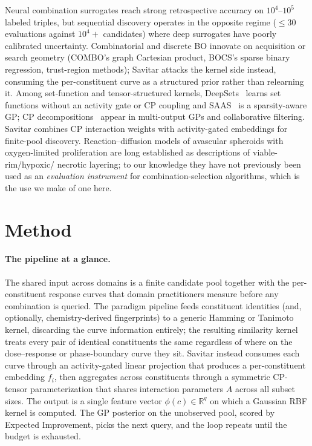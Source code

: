\documentclass{article}
\begin{document}
Neural combination surrogates reach strong retrospective accuracy on
$10^4$--$10^5$ labeled triples, but sequential discovery operates in the
opposite regime ($\le 30$ evaluations against $10^4+$ candidates) where
deep surrogates have poorly calibrated uncertainty. Combinatorial and
discrete BO innovate on acquisition or search geometry (COMBO's graph
Cartesian product, BOCS's sparse binary regression, trust-region methods);
Savitar attacks the kernel side instead, consuming the per-constituent curve
as a structured prior rather than relearning it. Among set-function and
tensor-structured kernels, DeepSets~\citep{zaheer2017} learns set functions without an activity
gate or CP coupling and SAAS~\citep{eriksson2021} is a sparsity-aware GP; CP decompositions~\citep{bro1997} appear
in multi-output GPs and collaborative filtering. Savitar combines CP
interaction weights with activity-gated embeddings for finite-pool discovery.
Reaction--diffusion models of avascular spheroids with oxygen-limited
proliferation are long established as descriptions of viable-rim/hypoxic/
necrotic layering; to our knowledge they have not previously been used as an
\emph{evaluation instrument} for combination-selection algorithms, which is
the use we make of one here.

\section{Method}
\label{sec:method}


\paragraph{The pipeline at a glance.} The shared input across domains is a
finite candidate pool together with the per-constituent response curves that
domain practitioners measure before any combination is queried. The paradigm
pipeline feeds constituent identities (and, optionally, chemistry-derived
fingerprints) to a generic Hamming or Tanimoto kernel, discarding the curve
information entirely; the resulting similarity kernel treats every pair of
identical constituents the same regardless of where on the dose--response or
phase-boundary curve they sit. Savitar instead consumes each curve through an
activity-gated linear projection that produces a per-constituent embedding
$f_i$, then aggregates across constituents through a symmetric CP-tensor
parameterization that shares interaction parameters $A$ across all subset
sizes. The output is a single feature vector $\phi(c) \in \mathbb{R}^q$ on
which a Gaussian RBF kernel is computed. The GP posterior on the unobserved
pool, scored by Expected Improvement, picks the next query, and the loop
repeats until the budget is exhausted.
\end{document}
